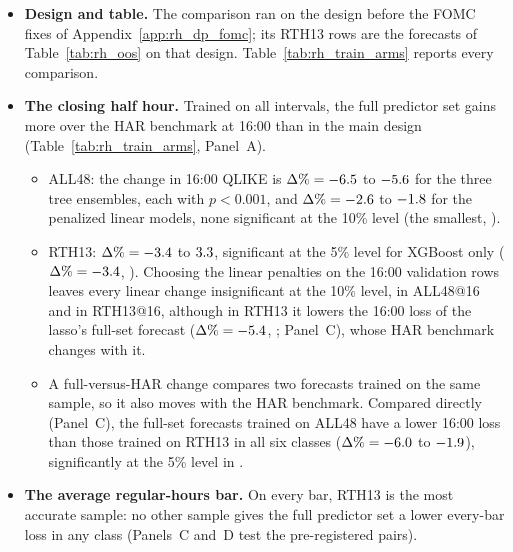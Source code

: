 \begin{itemize}
  16:00 bar and on every regular-hours bar. The linear rule also fixed secondary samples for the penalized linear
  models (a natively built CLOSE, and penalties chosen on the 16:00 validation rows, ALL48@16 and RTH13@16). Samples
  with equal numbers of training rows were added before their models were estimated (for the linear models by a
  dated addendum to the rule).
\item \textbf{Design and table.} The comparison ran on the design before the FOMC fixes of
  Appendix~\ref{app:rh_dp_fomc}; its RTH13 rows are the forecasts of Table~\ref{tab:rh_oos} on that design.
  Table~\ref{tab:rh_train_arms} reports every comparison.
\item \textbf{The closing half hour.} Trained on all \rhtaNIntervals{} intervals, the full predictor set gains more
  over the HAR benchmark at 16:00 than in the main design (Table~\ref{tab:rh_train_arms}, Panel~A).
  \begin{itemize}
  \item ALL48: the change in 16:00 QLIKE is $\Delta\% = -6.5$ to $-5.6$ for the
    three tree ensembles, each with $p < 0.001$, and $\Delta\% = -2.6$ to $-1.8$
    for the penalized linear models, none significant at the 10\% level (the smallest, \rhtaLinAllClosePMin).
  \item RTH13: $\Delta\% = -3.4$ to $3.3$, significant at the 5\% level for XGBoost
    only ($\Delta\% = -3.4$, \rhtaPXgbRthClose). Choosing the linear penalties on the 16:00 validation
    rows leaves every linear change insignificant at the 10\% level, in ALL48@16 and in RTH13@16, although in RTH13
    it lowers the 16:00 loss of the lasso's full-set forecast ($\Delta\% = -5.4$,
    \rhtaXPLassoRthCtVsRthClose; Panel~C), whose HAR benchmark changes with it.
  \item A full-versus-HAR change compares two forecasts trained on the same sample, so it also moves with the HAR
    benchmark. Compared directly (Panel~C), the full-set forecasts trained on ALL48 have a lower 16:00 loss than
    those trained on RTH13 in all six classes ($\Delta\% = -6.0$ to
    $-1.9$), significantly at the 5\% level in \rhtaNAllVsRthCloseSig.
  \end{itemize}
\item \textbf{The average regular-hours bar.} On every bar, RTH13 is the most accurate sample: no other sample
  gives the full predictor set a lower every-bar loss in any class (Panels~C and~D test the pre-registered pairs).

\end{itemize}

